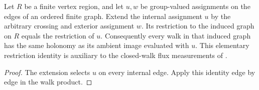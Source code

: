 \begin{lemma}%
    \label{thm:peps_regular_inserted_walk_holonomy}
    \leanok
    Let $R$ be a finite vertex region, and let $u,w$ be group-valued
    assignments on the edges of an ordered finite graph. Extend the
    internal assignment $u$ by the arbitrary crossing and exterior
    assignment $w$. Its restriction to the induced graph on $R$ equals
    the restriction of $u$. Consequently every walk in that induced
    graph has the same holonomy as its ambient image evaluated with $u$.
    This elementary restriction identity is auxiliary to the
    closed-walk flux measurements of
    \cite[\S6.6, local lines 2380--2415]{Schuch2010PEPS}.
\end{lemma}

\begin{proof}\leanok
    The extension selects $u$ on every internal edge. Apply this identity
    edge by edge in the walk product.
\end{proof}
